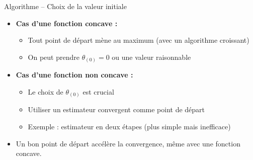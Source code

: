 \documentclass[11pt,aspectratio=169]{beamer}
\begin{document}
\begin{frame}{Algorithme -- Choix de la valeur initiale}

\begin{itemize}

\item \textbf{Cas d'une fonction concave :}
  \begin{itemize}
    \item Tout point de départ mène au maximum (avec un algorithme croissant)\newline
    \item On peut prendre $\theta_{(0)} = 0$ ou une valeur raisonnable\newline
  \end{itemize}

\item \textbf{Cas d'une fonction non concave :}
  \begin{itemize}
    \item Le choix de $\theta_{(0)}$ est crucial\newline
    \item Utiliser un estimateur convergent comme point de départ\newline
    \item Exemple : estimateur en deux étapes (plus simple mais inefficace)\newline
  \end{itemize}

\item Un bon point de départ accélère la convergence, même avec une fonction concave.

\end{itemize}

\end{frame}
\end{document}
